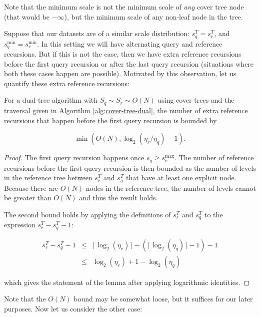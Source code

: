 Note that the minimum scale is not the minimum scale of {\it any} cover tree
node (that would be $-\infty$), but the minimum scale of any non-leaf node in
the tree.

Suppose that our datasets are of a similar scale distribution: $s_q^T = s_r^T$,
and $s_q^{\min} = s_r^{\min}$.  In this setting we will have alternating query
and reference recursions.  But if this is not the case, then we have extra
reference recursions before the first query recursion or after the last query
recursion (situations where both these cases happen are possible).  Motivated by
this observation, let us quantify these extra reference recursions:

\begin{lemma}
\label{lem:extcase1}
For a dual-tree algorithm with $S_q \sim S_r \sim O(N)$ using cover trees and
the traversal given in Algorithm \ref{alg:cover-tree-dual}, the number of extra
reference recursions that happen before the first query recursion is bounded by

\begin{equation}
\min\left(O(N), \log_2(\eta_r / \eta_q) - 1\right).
\end{equation}
\end{lemma}

\begin{proof}
The first query recursion happens once $s_q \ge s_r^{\max}$.  The number of
reference recursions before the first query recursion is then bounded as the
number of levels in the reference tree between $s_r^T$ and $s_q^T$ that have at
least one explicit node.  Because there are $O(N)$ nodes in the reference tree,
the number of levels cannot be greater than $O(N)$ and thus the result holds.

The second bound holds by applying the definitions of $s_r^T$ and $s_q^T$ to the
expression $s_r^T - s_q^T - 1$:

\begin{eqnarray}
s_r^T - s_q^T - 1 &\le& \lceil \log_2(\eta_r) \rceil - (\lceil \log_2(\eta_q)
\rceil - 1) - 1 \\
&\le& \log_2(\eta_r) + 1 - \log_2(\eta_q)
\end{eqnarray}

\noindent which gives the statement of the lemma after applying logarithmic
identities.
\end{proof}

Note that the $O(N)$ bound may be somewhat loose, but it suffices for our later
purposes.  Now let us consider the other case:


